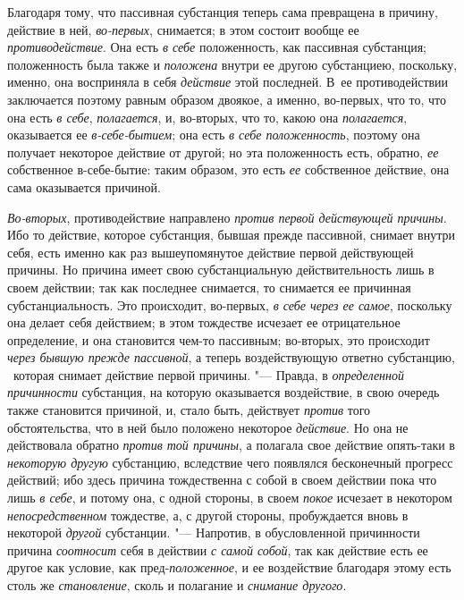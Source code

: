 Благодаря тому, что пассивная субстанция теперь сама превращена в причину,
действие в ней, {\em во-первых}, снимается; в этом
состоит вообще ее {\em противодействие}. Она есть
{\em в себе} положенность, как пассивная субстанция;
положенность была также и {\em положена} внутри ее
другою субстанциею, поскольку, именно, она восприняла в себя
{\em действие} этой последней. В~ее противодействии
заключается поэтому равным образом двоякое, а именно, во-первых, что то,
что она есть {\em в себе}, {\em полагается}, и, во-вторых, что то, какою она
{\em полагается}, оказывается ее {\em в-себе-бытием}; она есть
{\em в себе положенность}, поэтому она получает
некоторое действие от другой; но эта положенность есть, обратно,
{\em ее} собственное в-себе-бытие: таким образом, это
есть {\em ее} собственное действие, она сама оказывается причиной.

{\em Во-вторых}, противодействие направлено
{\em против первой действующей причины}. Ибо то
действие, которое субстанция, бывшая прежде пассивной, снимает внутри себя,
есть именно как раз вышеупомянутое действие первой действующей причины. Но
причина имеет свою субстанциальную действительность лишь в своем действии;
так как последнее снимается, то снимается ее причинная субстанциальность.
Это происходит, во-первых, {\em в себе через ее самое},
поскольку она делает себя действием; в этом тождестве исчезает ее
отрицательное определение, и она становится чем-то пассивным; во-вторых,
это происходит {\em через бывшую прежде пассивной}, а
теперь воздействующую ответно субстанцию, \ которая снимает действие первой
причины. "--- Правда, в {\em определенной причинности}
субстанция, на которую оказывается воздействие, в свою очередь также
становится причиной, и, стало быть, действует
{\em против} того обстоятельства, что в ней было
положено некоторое {\em действие}. Но она не
действовала обратно {\em против той причины}, а
полагала свое действие опять-таки в {\em некоторую
другую} субстанцию, вследствие чего появлялся бесконечный прогресс
действий; ибо здесь причина тождественна с собой в своем действии пока что
лишь {\em в себе}, и потому она, с одной стороны, в
своем {\em покое} исчезает в некотором
{\em непосредственном} тождестве, а, с другой стороны,
пробуждается вновь в некоторой {\em другой} субстанции.
"--- Напротив, в обусловленной причинности причина
{\em соотносит} себя в действии
{\em с самой собой}, так как действие есть ее другое
как условие, как пред-{\em положенное}, и ее
воздействие благодаря этому есть столь же
{\em становление}, сколь и полагание и {\em снимание другого}.

